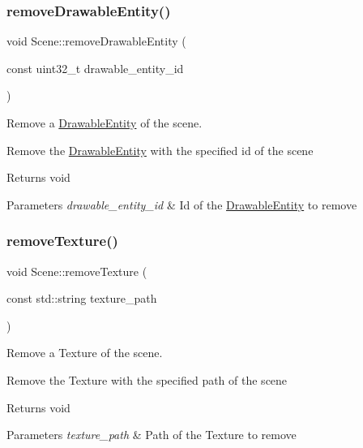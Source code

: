 \subsubsection{\texorpdfstring{remove\+Drawable\+Entity()}{removeDrawableEntity()}}
{\footnotesize\ttfamily void Scene\+::remove\+Drawable\+Entity (\begin{DoxyParamCaption}\item[{const uint32\+\_\+t}]{drawable\+\_\+entity\+\_\+id }\end{DoxyParamCaption})}



Remove a \hyperlink{class_drawable_entity}{Drawable\+Entity} of the scene. 

Remove the \hyperlink{class_drawable_entity}{Drawable\+Entity} with the specified id of the scene

\begin{DoxyReturn}{Returns}
void 
\end{DoxyReturn}

\begin{DoxyParams}{Parameters}
{\em drawable\+\_\+entity\+\_\+id} & Id of the \hyperlink{class_drawable_entity}{Drawable\+Entity} to remove \\
\hline
\end{DoxyParams}
\mbox{\label{class_scene_a6418fa4353c7d079b42e11af7343c8a9}} 
\subsubsection{\texorpdfstring{remove\+Texture()}{removeTexture()}}
{\footnotesize\ttfamily void Scene\+::remove\+Texture (\begin{DoxyParamCaption}\item[{const std\+::string}]{texture\+\_\+path }\end{DoxyParamCaption})}



Remove a Texture of the scene. 

Remove the Texture with the specified path of the scene

\begin{DoxyReturn}{Returns}
void 
\end{DoxyReturn}

\begin{DoxyParams}{Parameters}
{\em texture\+\_\+path} & Path of the Texture to remove \\
\hline
\end{DoxyParams}
\mbox{\label{class_scene_a70c218eb67b3507a56486e1dd945f095}} 
